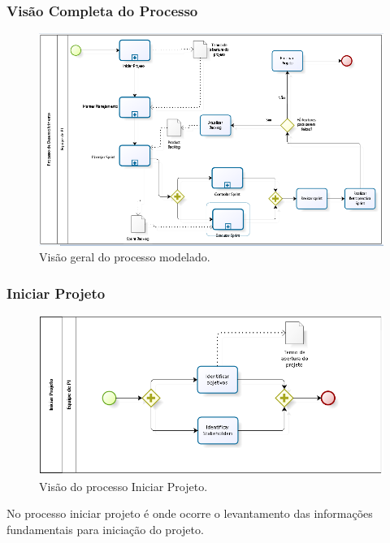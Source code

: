 \subsubsection{Visão Completa do Processo}
\begin{figure}[H]
	\centering
	\label{Visão geral do processo modelado}
		\includegraphics[keepaspectratio=true,scale=0.9,angle=270]{planejamento/ProcessoCompleto.png}
	\caption{Visão geral do processo modelado.}
\end{figure}

\subsubsection{Iniciar Projeto}

\begin{figure}[H]
	\centering
	\label{Visão do processo Iniciar Projeto}
		\includegraphics[keepaspectratio=true,scale=0.9,angle=270]{planejamento/IniciarProjeto.png}
	\caption{Visão do processo Iniciar Projeto.}
\end{figure}

No processo iniciar projeto é onde ocorre o levantamento das informações fundamentais para iniciação do projeto. 

